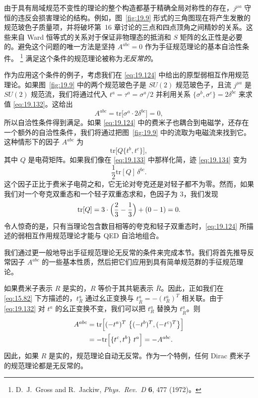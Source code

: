 由于具有局域规范不变性的理论的整个构造都基于精确全局对称性的存在，$j^{\mu a}$ 守恒的违反会损害理论的结构。例如，图~\ref{fig:19.9} 形式的三角图现在将产生发散的规范玻色子质量项，并将破坏第~16 章讨论的三点和四点顶角之间精妙的关系。这些来自 Ward 恒等式的关系对于保证非物理态的抵消和 $S$ 矩阵的幺正性是必要的。避免这个问题的唯一方法是坚持 $A^{abc} = 0$ 作为手征规范理论的基本自洽性条件。%
\footnote{D.~J.~Gross and R.~Jackiw, \emph{Phys.\ Rev.\ D} \textbf{6}, 477
(1972)。} 满足这个条件的规范理论被称为\emph{无反常的}。

作为应用这个条件的例子，考虑我们在 \eqref{eq:19.124} 中给出的原型弱相互作用规范理论。如果图~\ref{fig:19.9} 中的两个规范玻色子是 $SU(2)$ 规范玻色子，且流 $j^{\mu a}$ 是 $SU(2)$ 规范流，我们将通过代入 $t^a = \tau^a = \sigma^a/2$ 并利用关系 $\{\sigma^b, \sigma^c\} = 2\delta^{bc}$ 来求值 \eqref{eq:19.132}。这给出
\begin{equation}
  A^{abc} = \mathrm{tr}\bigl[ \sigma^a\cdot 2\delta^{bc} \bigr] = 0 ,
  \label{eq:19.133}
\end{equation}
所以自洽性条件得到满足。如果 \eqref{eq:19.124} 中的费米子也耦合到电磁学，还存在一个额外的自洽性条件，我们将通过把图~\ref{fig:19.9} 中的流取为电磁流来找到它。这种情形下的因子 $A^{abc}$ 为
\begin{equation}
  \mathrm{tr}\bigl[ Q\{t^b, t^c\} \bigr] ,
  \label{eq:19.134}
\end{equation}
其中 $Q$ 是电荷矩阵。如果我们像在 \eqref{eq:19.133} 中那样化简，迹 \eqref{eq:19.134} 变为
\begin{equation}
  \frac{1}{2}\mathrm{tr}[Q]\,\delta^{bc} .
  \label{eq:19.135}
\end{equation}
这个因子正比于费米子电荷之和，它无论对夸克还是对轻子都不为零。然而，如果我们对一个夸克双重态和一个轻子双重态求和，色因子为 3，我们发现
\begin{equation}
  \mathrm{tr}[Q] = 3\cdot\Bigl( \frac{2}{3} - \frac{1}{3} \Bigr)
    + (0 - 1) = 0 .
  \label{eq:19.136}
\end{equation}
令人惊奇的是，只有当理论包含数目相等的夸克和轻子双重态时，\eqref{eq:19.124} 所描述的弱相互作用规范理论才能与 QED 自洽地组合。

我们通过更一般地导出手征规范理论无反常的条件来完成本节。我们将首先推导反常因子 $A^{abc}$ 的一些基本性质，然后把它们应用到具有简单规范群的手征规范理论。

如果费米子表示 $R$ 是实的，$R$ 等价于其共轭表示 $\bar{R}$。因此，正如我们在 \eqref{eq:15.82} 下方描述的，$t^a_R$ 通过幺正变换与 $t^a_{\bar{R}} = -(t^a_R)^T$ 相关联。由于 \eqref{eq:19.132} 对 $t^a$ 的幺正变换不变，我们可以把 $t^a_R$ 替换为 $t^a_{\bar{R}}$。则
\begin{equation}
  \begin{aligned}
    A^{abc} &= \mathrm{tr}\Bigl[ (-t^a)^T\ \bigl\{ (-t^b)^T, (-t^c)^T
      \bigr\} \Bigr]\\
    &= -\mathrm{tr}\Bigl[ \{ t^c, t^b \}\ t^a \Bigr] = -A^{abc} .
  \end{aligned}
  \label{eq:19.137}
\end{equation}
因此，如果 $R$ 是实的，规范理论自动无反常。作为一个特例，任何 Dirac 费米子的规范理论都是无反常的。


